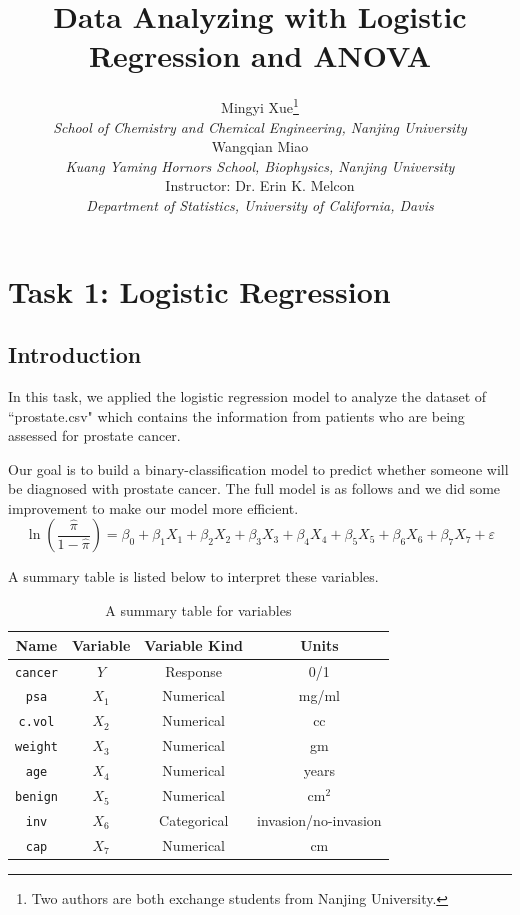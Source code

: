 \documentclass[a4paper,11pt,onecolumn,twoside]{article}
\title{\Large \textbf{Data Analyzing with Logistic Regression and ANOVA}}
\author{
Mingyi Xue\footnote{Two authors are both exchange students from Nanjing University.}\\[2pt]
{\large \textit{School of Chemistry and Chemical Engineering, Nanjing University}}\\[6pt]
Wangqian Miao
\\[2pt]
{\large \textit{Kuang Yaming Hornors School, Biophysics, Nanjing University}}\\[6pt]
Instructor: Dr. Erin K. Melcon\\[2pt]
{\large \textit{Department of Statistics, University of California, Davis}}\\[2pt]
}
\date{}
\begin{document}
\maketitle
\thispagestyle{firststyle}
\setlength{\oddsidemargin}{ 1cm}
\setlength{\evensidemargin}{\oddsidemargin}
\setlength{\textwidth}{15.50cm}
\vspace{-.8cm}
\setcounter{page}{1}
\setlength{\oddsidemargin}{-.5cm}  %
\setlength{\evensidemargin}{\oddsidemargin}
\setlength{\textwidth}{17.00cm}
\tableofcontents
\newpage
\section{Task 1: Logistic Regression}
\subsection{Introduction}
In this task, we applied the logistic regression model to analyze the dataset of ``prostate.csv" which contains the information from patients who are being assessed for prostate cancer.\par
Our goal is to build a binary-classification model to predict whether someone will be diagnosed with prostate cancer.
The full model is as follows and we did some improvement to make our model more efficient.
\begin{equation}
\ln\left(\frac{\hat{\pi}}{1-\hat{\pi}}\right)=\beta_0+\beta_1X_1+\beta_2X_2+\beta_3X_3+\beta_4X_4+\beta_5X_5+\beta_{6}X_6+\beta_{7}X_7+\varepsilon
\end{equation}
\par
A summary table is listed below to interpret these variables. 
\begin{table}[H]
	\centering
	\begin{tabular}{cccc}
		\midrule[1.5pt]
		Name& Variable &Variable Kind  & Units\\
		\hline
		\texttt{cancer}&$Y$ & Response  & 0/1\\
		\texttt{psa} &$X_1$& Numerical  & mg/ml  \\
		\texttt{c.vol}& $X_2$ &Numerical &cc  \\
		\texttt{weight}& $X_3$ & Numerical& gm \\
		\texttt{age}&$X_4$& Numerical  & years \\
		\texttt{benign}& $X_5$& Numerical  & cm$^{2}$ \\
		\texttt{inv}& $X_6$& Categorical  & invasion/no-invasion \\
		\texttt{cap}& $X_7$& Numerical  & cm \\
		\midrule[1.5pt]
	\end{tabular}
	\caption{A summary table for variables }
\end{table}
\end{document}
